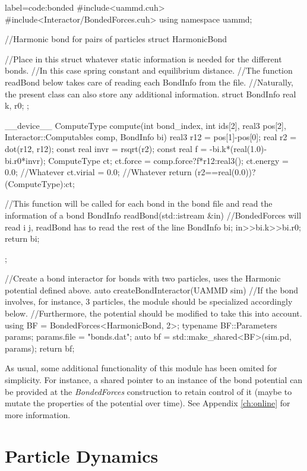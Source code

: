 \documentclass[twoside,openright,titlepage,numbers=noenddot,%
headinclude,footinclude,cleardoublepage=empty,abstract=on,
BCOR=5mm,fontsize=11pt, dvipsnames, paper=b5
]{scrreprt}
\begin{document}
\begin{code2} {label=code:bonded}
#include<uammd.cuh>
#include<Interactor/BondedForces.cuh>
using namespace uammd;

//Harmonic bond for pairs of particles
struct HarmonicBond{
  //Place in this struct whatever static information is needed for the different bonds.
  //In this case spring constant and equilibrium distance.
  //The function readBond below takes care of reading each BondInfo from the file.
  //Naturally, the present class can also store any additional information.
  struct BondInfo{
    real k, r0;
  };

  __device__ ComputeType compute(int bond_index,
                        int ids[2], real3 pos[2],
                        Interactor::Computables comp,
                        BondInfo bi){
    real3 r12 = pos[1]-pos[0];
    real r2 = dot(r12, r12);
    const real invr = rsqrt(r2);
    const real f = -bi.k*(real(1.0)-bi.r0*invr);
    ComputeType ct;
    ct.force = comp.force?f*r12:real3();
    ct.energy = 0.0; //Whatever
    ct.virial = 0.0; //Whatever
    return (r2==real(0.0))?(ComputeType{}):ct;
  }

  //This function will be called for each bond in the bond file and read the information of a bond
  BondInfo readBond(std::istream &in){
    //BondedForces will read i j, readBond has to read the rest of the line
    BondInfo bi;
    in>>bi.k>>bi.r0;
    return bi;
  }
};

//Create a bond interactor for bonds with two particles, uses the Harmonic potential defined above.
auto createBondInteractor(UAMMD sim){
  //If the bond involves, for instance, 3 particles, the module should be specialized accordingly below.
  //Furthermore, the potential should be modified to take this into account.
  using BF = BondedForces<HarmonicBond, 2>;
  typename BF::Parameters params;
  params.file = "bonds.dat";
  auto bf = std::make_shared<BF>(sim.pd, params);
  return bf;
}

\end{code2}

As usual, some additional functionality of this module has been omited for simplicity. For instance, a shared pointer to an instance of the bond potential can be provided at the \emph{BondedForces} construction to retain control of it (maybe to mutate the properties of the potential over time). See Appendix \ref{ch:online} for more information.

\chapter{Particle Dynamics}\label{sec:dynamics}
\end{document}

